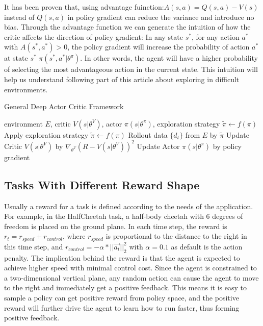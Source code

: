 It has been proven that, using advantage fuinction:$A(s,a)=Q(s,a)-V(s)$ instead of $Q(s,a)$ in policy gradient can reduce the variance and introduce no bias. Through the advantage function we can generate the intuition of how the critic affects the direction of policy gradient: In any state $s^*$, for any action $a^*$ with $A(s^*,a^*) > 0$, the policy gradient will increase the probability of action $a^*$ at state $s^*$ $\pi(s^*,a^*|\theta^{\pi})$. In other words, the agent will have a higher probability of selecting the most advantageous action in the current state. This intuition will help us understand following part of this article about exploring in difficult environments.


\begin{algorithm}[htbp]
    \caption{General Deep Actor Critic Framework}
    \label{alg:gac}
 \begin{algorithmic}
     environment $E$, critic $V(s|\theta^V)$, actor $\pi(s|\theta^\pi)$, exploration strategy $\tilde\pi \leftarrow f(\pi)$
    \STATE Apply exploration strategy $\tilde\pi \leftarrow f(\pi)$
    \STATE Rollout data $\{d_t\}$ from $E$ by $\tilde\pi$
    \STATE Update Critic $V(s|\theta^V)$ by $\nabla_{\theta^V}(R-V(s|\theta^V))^2$
    \STATE Update Actor $\pi(s|\theta^\pi)$ by policy gradient 
    \ENDFOR
    \ENDFOR
 \end{algorithmic}
 \end{algorithm}


\subsection{Tasks With Different Reward Shape}
\label{sec:tasks}
Usually a reward for a task is defined according to the needs of the application. For example, in the HalfCheetah task, a half-body cheetah with 6 degrees of freedom is placed on the ground plane. In each time step, the reward is $r_t = r_{speed} + r_{control}$, where $r_{speed}$ is proportional to the distance to the right in this time step, and $r_{control} = -\alpha*||\vec{a_t}||^2_2$ with $\alpha = 0.1$ as default is the action penalty. The implication behind the reward is that the agent is expected to achieve higher speed with minimal control cost. Since the agent is constrained to a two-dimensional vertical plane, any random action can cause the agent to move to the right and immediately get a positive feedback. This means it is easy to sample a policy can get positive reward from policy space, and the positive reward will further drive the agent to learn how to run faster, thus forming positive feedback.

